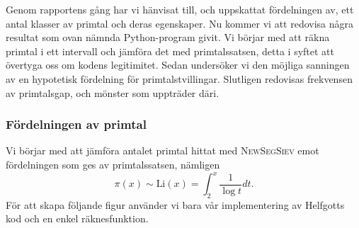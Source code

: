 
Genom rapportens gång har vi hänvisat till, och uppskattat fördelningen av, ett antal klasser av primtal och deras egenskaper. 
Nu kommer vi att redovisa några resultat som ovan nämnda Python-program givit.
Vi börjar med att räkna primtal i ett intervall och jämföra det med primtalssatsen, detta i syftet att övertyga oss om kodens legitimitet. 
Sedan undersöker vi den möjliga sanningen av en hypotetisk fördelning för primtalstvillingar. 
Slutligen redovisas frekvensen av primtalsgap, och mönster som uppträder däri.

\subsubsection{Fördelningen av primtal}\label{app.primes.title}

Vi börjar med att jämföra antalet primtal hittat med \textsc{NewSegSiev} emot fördelningen som ges av primtalssatsen, nämligen
\begin{equation}
    \pi(x) \sim \text{Li}(x) = \int_2^x\frac{1}{\log t}dt\label{app.primes.PNT}.
\end{equation}
För att skapa följande figur använder vi bara vår implementering av Helfgotts kod och en enkel räknesfunktion.


